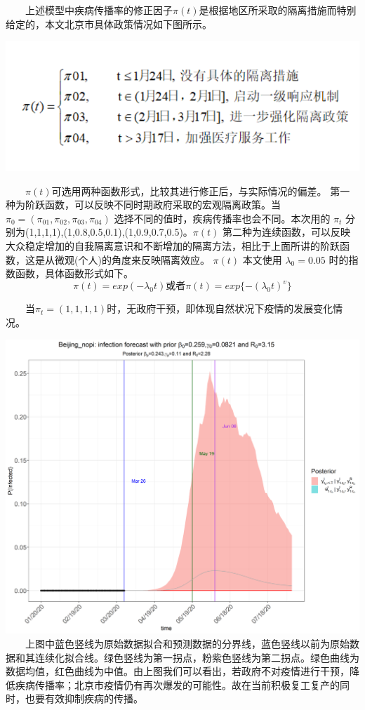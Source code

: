\documentclass[12pt,a5paper,]{article}
\begin{document}
  上述模型中疾病传播率的修正因子\(\pi(t)\)是根据地区所采取的隔离措施而特别给定的，本文北京市具体政策情况如下图所示。

\includegraphics[width=7.42in]{figures/2}

  \(\pi(t)\)可选用两种函数形式，比较其进行修正后，与实际情况的偏差。
第一种为阶跃函数，可以反映不同时期政府采取的宏观隔离政策。当
\(\pi_{0}=(\pi_{01},\pi_{02},\pi_{03},\pi_{04})\)
选择不同的值时，疾病传播率也会不同。本次用的 \(\pi_{t}\)
分别为(1,1,1,1),(1,0.8,0.5,0.1),(1,0.9,0.7,0.5)。\(\pi(t)\)
第二种为连续函数，可以反映大众稳定增加的自我隔离意识和不断增加的隔离方法，相比于上面所讲的阶跃函数，这是从微观(个人)的角度来反映隔离效应。
\(\pi(t)\) 本文使用 \(\lambda_0=0.05\) 时的指数函数，具体函数形式如下。
\[ \pi(t)=exp(-\lambda_0t) 或者 \pi(t)=exp\lbrace-(\lambda_0t)^v\rbrace \]

  当\(\pi_{t}=(1,1,1,1)\)时，无政府干预，即体现自然状况下疫情的发展变化情况。

\includegraphics[width=50in]{figures/infection3}
  上图中蓝色竖线为原始数据拟合和预测数据的分界线，蓝色竖线以前为原始数据和其连续化拟合线。绿色竖线为第一拐点，粉紫色竖线为第二拐点。绿色曲线为数据均值，红色曲线为中值。由上图我们可以看出，若政府不对疫情进行干预，降低疾病传播率；北京市疫情仍有再次爆发的可能性。故在当前积极复工复产的同时，也要有效抑制疾病的传播。
\end{document}
